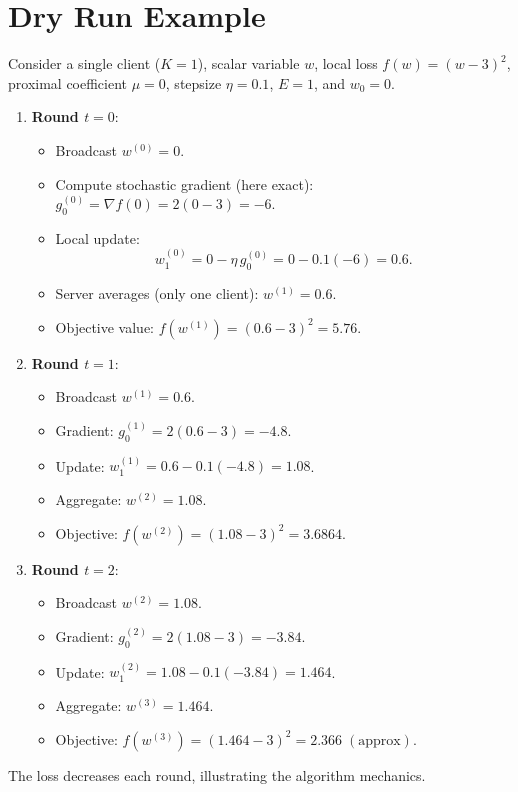 \documentclass[11pt]{article}
\begin{document}
\section*{Dry Run Example}
Consider a single client ($K=1$), scalar variable $w$, local loss $f(w)=(w-3)^{2}$, proximal coefficient $\mu=0$, stepsize $\eta=0.1$, $E=1$, and $w_{0}=0$.

\begin{enumerate}
\item \textbf{Round $t=0$}:
    \begin{itemize}
    \item Broadcast $w^{(0)}=0$.
    \item Compute stochastic gradient (here exact): $g^{(0)}_{0}= \nabla f(0)=2(0-3)=-6$.
    \item Local update:
    \[
    w^{(0)}_{1}=0-\eta\,g^{(0)}_{0}=0-0.1(-6)=0.6.
    \]
    \item Server averages (only one client): $w^{(1)}=0.6$.
    \item Objective value: $f(w^{(1)})=(0.6-3)^{2}=5.76$.
    \end{itemize}
\item \textbf{Round $t=1$}:
    \begin{itemize}
    \item Broadcast $w^{(1)}=0.6$.
    \item Gradient: $g^{(1)}_{0}=2(0.6-3)=-4.8$.
    \item Update: $w^{(1)}_{1}=0.6-0.1(-4.8)=1.08$.
    \item Aggregate: $w^{(2)}=1.08$.
    \item Objective: $f(w^{(2)})=(1.08-3)^{2}=3.6864$.
    \end{itemize}
\item \textbf{Round $t=2$}:
    \begin{itemize}
    \item Broadcast $w^{(2)}=1.08$.
    \item Gradient: $g^{(2)}_{0}=2(1.08-3)=-3.84$.
    \item Update: $w^{(2)}_{1}=1.08-0.1(-3.84)=1.464$.
    \item Aggregate: $w^{(3)}=1.464$.
    \item Objective: $f(w^{(3)})=(1.464-3)^{2}=2.366\;(\text{approx})$.
    \end{itemize}
\end{enumerate}
The loss decreases each round, illustrating the algorithm mechanics.

\newpage
\end{document}
